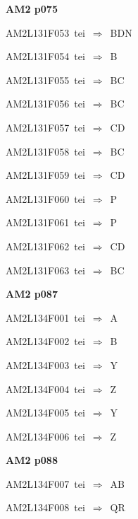 \par\vfill\eject
{\bf\hfill AM2 p075\hfill\hbox{}}\par\bigskip
{\sixrm AM2L131F053\ {\sixit tei}\ }$\Rightarrow$\ BDN\par\smallskip
{\sixrm AM2L131F054\ {\sixit tei}\ }$\Rightarrow$\ B\par\smallskip
{\sixrm AM2L131F055\ {\sixit tei}\ }$\Rightarrow$\ BC\par\smallskip
{\sixrm AM2L131F056\ {\sixit tei}\ }$\Rightarrow$\ BC\par\smallskip
{\sixrm AM2L131F057\ {\sixit tei}\ }$\Rightarrow$\ CD\par\smallskip
{\sixrm AM2L131F058\ {\sixit tei}\ }$\Rightarrow$\ BC\par\smallskip
{\sixrm AM2L131F059\ {\sixit tei}\ }$\Rightarrow$\ CD\par\smallskip
{\sixrm AM2L131F060\ {\sixit tei}\ }$\Rightarrow$\ P\par\smallskip
{\sixrm AM2L131F061\ {\sixit tei}\ }$\Rightarrow$\ P\par\smallskip
{\sixrm AM2L131F062\ {\sixit tei}\ }$\Rightarrow$\ CD\par\smallskip
{\sixrm AM2L131F063\ {\sixit tei}\ }$\Rightarrow$\ BC\par\smallskip

\par\vfill\eject
{\bf\hfill AM2 p087\hfill\hbox{}}\par\bigskip
{\sixrm AM2L134F001\ {\sixit tei}\ }$\Rightarrow$\ A\par\smallskip
{\sixrm AM2L134F002\ {\sixit tei}\ }$\Rightarrow$\ B\par\smallskip
{\sixrm AM2L134F003\ {\sixit tei}\ }$\Rightarrow$\ Y\par\smallskip
{\sixrm AM2L134F004\ {\sixit tei}\ }$\Rightarrow$\ Z\par\smallskip
{\sixrm AM2L134F005\ {\sixit tei}\ }$\Rightarrow$\ Y\par\smallskip
{\sixrm AM2L134F006\ {\sixit tei}\ }$\Rightarrow$\ Z\par\smallskip

\par\vfill\eject
{\bf\hfill AM2 p088\hfill\hbox{}}\par\bigskip
{\sixrm AM2L134F007\ {\sixit tei}\ }$\Rightarrow$\ AB\par\smallskip
{\sixrm AM2L134F008\ {\sixit tei}\ }$\Rightarrow$\ QR\par\smallskip

